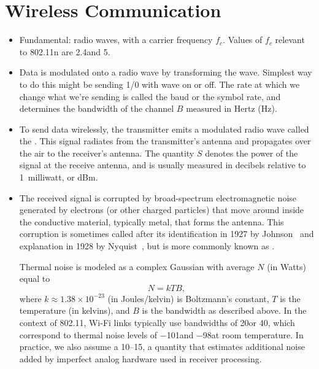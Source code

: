 \section{Wireless Communication}
\begin{itemize}
\item Fundamental: radio waves, with a carrier frequency $f_c$. Values of $f_c$ relevant to 802.11n are 2.4\GHz and 5\GHz.
\item Data is modulated onto a radio wave by transforming the wave. Simplest way to do this might be sending 1/0 with wave on or off. The rate at which we change what we're sending is called the baud or the symbol rate, and determines the bandwidth of the channel $B$ measured in Hertz (Hz).
\item To send data wirelessly, the transmitter emits a modulated radio wave called the . This signal radiates from the transmitter's antenna and propagates over the air to the receiver's antenna. The quantity $S$ denotes the power of the signal at the receive antenna, and is usually measured in decibels relative to 1~milliwatt, or dBm.
\item The received signal is corrupted by broad-spectrum electromagnetic noise generated by electrons (or other charged particles) that move around inside the conductive material, typically metal, that forms the antenna. This corruption is sometimes called  after its identification in 1927 by Johnson~\cite{Johnson_noise} and explanation in 1928 by Nyquist~\cite{Nyquist_noise}, but is more commonly known as .

Thermal noise is modeled as a complex Gaussian with average  $N$ (in Watts) equal to
\begin{equation}
N = kTB,
\end{equation}
where $k\approx1.38\times10^{-23}$ (in Joules/kelvin) is Boltzmann's constant, $T$ is the temperature (in kelvins), and $B$ is the bandwidth as described above.
In the context of 802.11, Wi-Fi links typically use bandwidths of 20\MHz or 40\MHz, which correspond to thermal noise levels of $-$101\dBm and $-$98\dBm at room temperature. In practice, we also assume a 10\dB--15\dB {}, a quantity that estimates additional noise added by imperfect analog hardware used in receiver processing.


\end{itemize}
